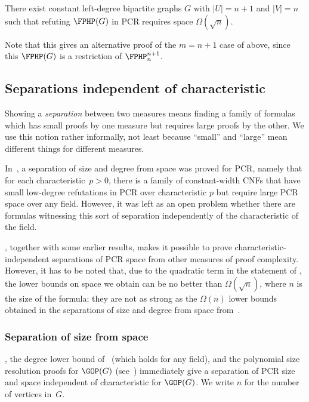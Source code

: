 \begin{corollary}
There exist constant left-degree bipartite graphs $G$ with $|U| = n+1$  and $|V| =n$ such that
refuting $\FPHP(G)$ in PCR requires space $\Omega(\sqrt{n})$.
\end{corollary}

Note that this gives an alternative proof of the $m=n+1$ case of  above, 
since this $\FPHP(G)$ is a restriction of $\FPHP^{n+1}_n$.

\subsection{Separations independent of characteristic}

Showing a \emph{separation} between two measures means
finding a family of formulas which
has small proofs by one measure but requires large
proofs by the other. We use this notion rather informally,
not least because ``small'' and ``large'' mean different things
for different measures.

In~\cite{DBLP:conf/icalp/FilmusLMNV13}, a separation of size and degree from space was proved for PCR, namely that
for each characteristic~$p>0$, there is a family of constant-width CNFs that have small low-degree refutations in PCR over characteristic $p$ but require large PCR space over any field. However, it was left as an open problem whether there are formulas witnessing this sort of separation 
independently of the characteristic of the field.

, together with some earlier results, makes it possible to prove characteristic-independent separations of PCR space from other measures of proof complexity. However, it has to be noted that, due to the quadratic term in the statement of , the 
lower bounds on space we obtain can be no better than $\Omega(\sqrt{n})$, where $n$ is the size of the formula;  they are not as strong as the
$\Omega(n)$ lower bounds obtained in the separations of size and degree from space from~\cite{DBLP:conf/icalp/FilmusLMNV13}.



\subsubsection{Separation of size from space}



, the degree lower bound of~\cite{DBLP:journals/tocl/GalesiL10} 
(which holds for any field), and the polynomial size resolution proofs for $\GOP(G)$ 
(see~\cite{DBLP:journals/tocl/GalesiL10}) immediately give a separation of PCR size and space
independent of characteristic for $\GOP(G)$.  We write $n$ for the number of vertices in~$G$.


